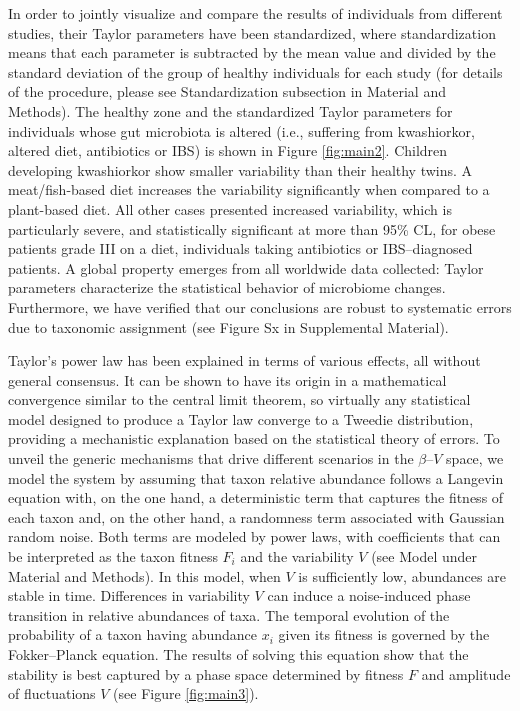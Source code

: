 In order to jointly visualize and compare the results of individuals from different studies, their Taylor parameters have been standardized, where standardization means that each parameter is subtracted by the mean value and divided by the standard deviation of the group of healthy individuals for each study (for details of the procedure, please see Standardization subsection in Material and Methods). The healthy zone and the standardized Taylor parameters for individuals whose gut microbiota is altered (i.e., suffering from kwashiorkor, altered diet, antibiotics or IBS) is shown in Figure \ref{fig:main2}. Children developing kwashiorkor show smaller variability than their healthy twins. A meat/fish-based diet increases the variability significantly when compared to a plant-based diet. All other cases presented increased variability, which is particularly severe, and statistically significant at more than 95\% CL, for obese patients grade III on a diet, individuals taking antibiotics or IBS--diagnosed patients. A global property emerges from all worldwide data collected: Taylor parameters characterize the statistical behavior of microbiome changes. Furthermore, we have verified that our conclusions are robust to systematic errors due to taxonomic assignment (see Figure Sx in Supplemental Material).

Taylor's power law has been explained in terms of various effects, all without general consensus. It can be shown to have its origin in a mathematical convergence similar to the central limit theorem, so virtually any statistical model designed to produce a Taylor law converge to a Tweedie distribution\cite{stat}, providing a mechanistic explanation based on the statistical theory of errors\cite{convergence1,convergence2,convergence3}. To unveil the generic mechanisms that drive different scenarios in the $\beta$--$V$ space, we model the system by assuming that taxon relative abundance follows a Langevin equation with, on the one hand, a deterministic term that captures the fitness of each taxon and, on the other hand, a randomness term associated with Gaussian random noise\cite{ranking}. Both terms are modeled by power laws, with coefficients that can be interpreted as the taxon fitness $F_i$ and the variability $V$ (see Model under Material and Methods). In this model, when $V$ is sufficiently low, abundances are stable in time. Differences in variability $V$ can induce a noise-induced phase transition in relative abundances of taxa. The temporal evolution of the probability of a taxon having abundance $x_i$ given its fitness is governed by the Fokker--Planck equation. The results of solving this equation show that the stability is best captured by a phase space determined by fitness $F$ and amplitude of fluctuations $V$ (see Figure \ref{fig:main3}). 

